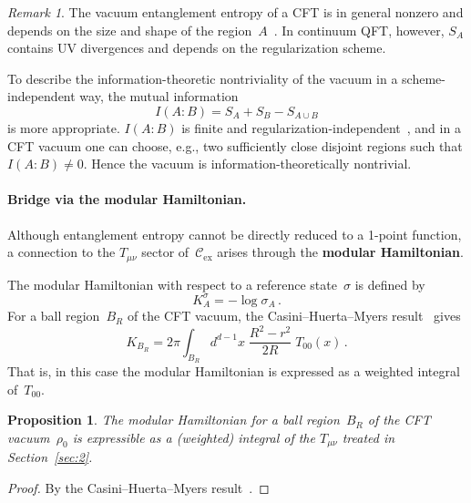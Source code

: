 \documentclass[
  aps,
  prd,
  preprint,
  groupedaddress,
  nofootinbib,
  longbibliography
]{revtex4-2}
\newtheorem{proposition}[definition]{Proposition}
\theoremstyle{remark}
\newtheorem{remark}[definition]{Remark}
\newcommand{\Cex}{\mathcal{C}_{\mathrm{ex}}}
\begin{document}
\begin{remark}\label{rem:EE-nonzero}
The vacuum entanglement entropy of a CFT is in general nonzero
and depends on the size and shape of the
region~$A$~\cite{ref32,ref33}.
In continuum QFT, however, $S_A$ contains UV divergences and
depends on the regularization scheme.

To describe the information-theoretic nontriviality of the vacuum
in a scheme-independent way, the mutual information
\begin{equation}\label{eq:MI}
  I(A:B) = S_A + S_B - S_{A\cup B}
\end{equation}
is more appropriate.
$I(A:B)$ is finite and regularization-independent~\cite{ref32,ref33,ref38},
and in a CFT vacuum one can choose, e.g., two sufficiently
close disjoint regions such that
$I(A:B)\neq 0$.
Hence the vacuum is information-theoretically nontrivial.
\end{remark}

\paragraph{Bridge via the modular Hamiltonian.}
Although entanglement entropy cannot be directly reduced to a
1-point function, a connection to the $T_{\mu\nu}$ sector
of~$\Cex$ arises through the \textbf{modular Hamiltonian}.

The modular Hamiltonian with respect to a reference
state~$\sigma$ is defined by~\cite{ref34}
\begin{equation}\label{eq:modular-H}
  K_A^\sigma = -\log\sigma_A\,.
\end{equation}
For a ball region~$B_R$ of the CFT vacuum, the
Casini--Huerta--Myers result~\cite{ref34} gives
\begin{equation}\label{eq:CHM}
  K_{B_R}
  = 2\pi\int_{B_R}d^{d-1}x\;\frac{R^2-r^2}{2R}\;T_{00}(x)\,.
\end{equation}
That is, in this case the modular Hamiltonian is expressed as a
weighted integral of~$T_{00}$.

\begin{proposition}\label{prop:modular-local}
The modular Hamiltonian for a ball region~$B_R$ of the CFT
vacuum~$\rho_0$ is expressible as a (weighted) integral of
the $T_{\mu\nu}$ treated in Section~\ref{sec:2}.
\end{proposition}

\begin{proof}
By the Casini--Huerta--Myers result~\cite{ref34}.
\end{proof}
\end{document}

